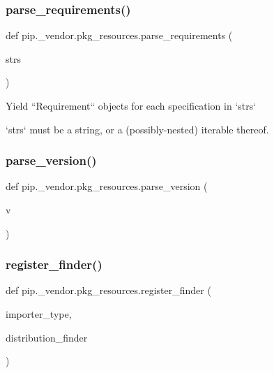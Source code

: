 \subsubsection{\texorpdfstring{parse\+\_\+requirements()}{parse\_requirements()}}
{\footnotesize\ttfamily def pip.\+\_\+vendor.\+pkg\+\_\+resources.\+parse\+\_\+requirements (\begin{DoxyParamCaption}\item[{}]{strs }\end{DoxyParamCaption})}

\begin{DoxyVerb}Yield ``Requirement`` objects for each specification in `strs`

`strs` must be a string, or a (possibly-nested) iterable thereof.
\end{DoxyVerb}
 \mbox{\label{namespacepip_1_1__vendor_1_1pkg__resources_a92bc2b76ba59a7f7e2c264890b280a65}} 
\subsubsection{\texorpdfstring{parse\+\_\+version()}{parse\_version()}}
{\footnotesize\ttfamily def pip.\+\_\+vendor.\+pkg\+\_\+resources.\+parse\+\_\+version (\begin{DoxyParamCaption}\item[{}]{v }\end{DoxyParamCaption})}

\mbox{\label{namespacepip_1_1__vendor_1_1pkg__resources_a01f6ac4d5a90eed912836743a7dedbc8}} 
\subsubsection{\texorpdfstring{register\+\_\+finder()}{register\_finder()}}
{\footnotesize\ttfamily def pip.\+\_\+vendor.\+pkg\+\_\+resources.\+register\+\_\+finder (\begin{DoxyParamCaption}\item[{}]{importer\+\_\+type,  }\item[{}]{distribution\+\_\+finder }\end{DoxyParamCaption})}

